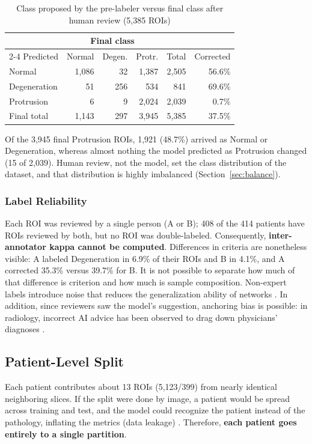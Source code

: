 \begin{table}[!htb]
\centering\footnotesize
\setlength{\tabcolsep}{3.5pt}
\caption{Class proposed by the pre-labeler versus final class after human review (5,385 ROIs)}
\label{tab:relabel}
\begin{tabular}{lrrrrr}
\toprule
 & \multicolumn{3}{c}{Final class} & & \\
\cmidrule(lr){2-4}
Predicted & Normal & Degen. & Protr. & Total & Corrected \\
\midrule
Normal       & 1,086 & 32  & 1,387 & 2,505 & 56.6\% \\
Degeneration & 51    & 256 & 534   & 841   & 69.6\% \\
Protrusion   & 6     & 9   & 2,024 & 2,039 & 0.7\% \\
\midrule
Final total  & 1,143 & 297 & 3,945 & 5,385 & 37.5\% \\
\bottomrule
\end{tabular}
\end{table}

Of the 3,945 final Protrusion ROIs, 1,921 (48.7\%) arrived as Normal or Degeneration, whereas almost nothing the model predicted as Protrusion changed (15 of 2,039). Human review, not the model, set the class distribution of the dataset, and that distribution is highly imbalanced (Section~\ref{sec:balance}).

\subsubsection{Label Reliability}
Each ROI was reviewed by a single person (A or B); 408 of the 414 patients have ROIs reviewed by both, but no ROI was double-labeled. Consequently, \textbf{inter-annotator kappa cannot be computed}. Differences in criteria are nonetheless visible: A labeled Degeneration in 6.9\% of their ROIs and B in 4.1\%, and A corrected 35.3\% versus 39.7\% for B. It is not possible to separate how much of that difference is criterion and how much is sample composition. Non-expert labels introduce noise that reduces the generalization ability of networks \cite{shi2024}. In addition, since reviewers saw the model's suggestion, anchoring bias is possible: in radiology, incorrect AI advice has been observed to drag down physicians' diagnoses \cite{prinster2024}.

\subsection{Patient-Level Split}
\label{sec:split}
Each patient contributes about 13 ROIs (5,123/399) from nearly identical neighboring slices. If the split were done by image, a patient would be spread across training and test, and the model could recognize the patient instead of the pathology, inflating the metrics (data leakage) \cite{brunekreef2024,rumala2023}. Therefore, \textbf{each patient goes entirely to a single partition}.

